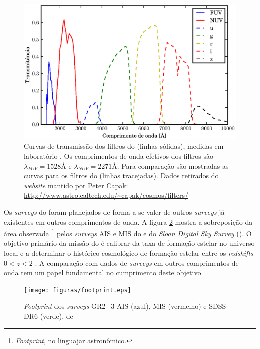 \begin{figure}
	\includegraphics{figuras/galex-filters.eps}
	\caption[Curvas de transmissão dos filtros do \galex.]
	{Curvas de transmissão dos filtros do \galex (linhas sólidas), medidas em
	laboratório \citep{Morrissey2005}. Os comprimentos de onda efetivos dos
	filtros são $\lambda_{FUV}=1528\text{\AA}$ e $\lambda_{NUV}=2271\text{\AA}$.
	Para comparação são mostradas as curvas para os filtros do \SDSS (linhas
	tracejadas). Dados retirados do {\em website} mantido por Peter Capak:
	\url{http://www.astro.caltech.edu/~capak/cosmos/filters/}}
	\label{fig:GalexFilters}
\end{figure}

Os {\em surveys} do \galex foram planejados de forma a se valer de outros {\em
surveys} já existentes em outros comprimentos de onda. A figura
\ref{fig:GalexSDSSOverlap} mostra a sobreposição da área observada
\footnote{{\em Footprint}, no linguajar astronômico.} pelos {\em surveys} AIS e
MIS do \galex e do {\em Sloan Digital Sky Survey} (\SDSS). O objetivo primário da
missão do \galex é calibrar da taxa de formação estelar no universo local e a
determinar o histórico cosmológico de formação estelar entre os {\em redshifts}
$0 < z < 2$ \citep{Martin2005}. A comparação com dados de {\em surveys} em outros
comprimentos de onda tem um papel fundamental no cumprimento deste objetivo.

\begin{figure}
	\texttt{[image: figuras/footprint.eps]}
	\caption[{\em Footprint} dos {\em surveys} \galex AIS, MIS e SDSS]
	{{\em Footprint} dos {\em surveys} \galex GR2+3 AIS (azul), MIS (vermelho) e
	SDSS DR6 (verde), de \citet{Budavari2009}}
	\label{fig:GalexSDSSOverlap}
\end{figure}


